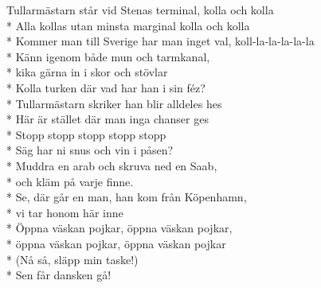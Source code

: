 \begin{SongText}[Tullarmästarn]
\begin{SongVerse}
Tullarmästarn står vid Stenas terminal, kolla och kolla\\*%
Alla kollas utan minsta marginal kolla och kolla\\*%
Kommer man till Sverige har man inget val, koll-la-la-la-la-la\\*%
Känn igenom både mun och tarmkanal,\\*%
kika gärna in i skor och stövlar\\*%
Kolla turken där vad har han i sin féz?\\*%
Tullarmästarn skriker han blir alldeles hes\\*%
Här är stället där man inga chanser ges\\*%
Stopp stopp stopp stopp stopp\\*%
Säg har ni snus och vin i påsen?\\*%
Muddra en arab och skruva ned en Saab,\\*%
och kläm på varje finne.\\*%
Se, där går en man, han kom från Köpenhamn,\\*%
vi tar honom här inne\\*%
Öppna väskan pojkar, öppna väskan pojkar,\\*%
öppna väskan pojkar, öppna väskan pojkar\\*%
(Nå så, släpp min taske!)\\*%
Sen får dansken gå!
\end{SongVerse}
\end{SongText}
